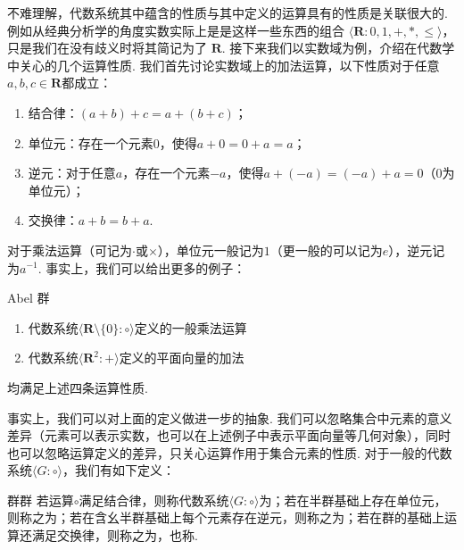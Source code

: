 不难理解，代数系统其中蕴含的性质与其中定义的运算具有的性质是关联很大的. 例如从经典分析学的角度实数实际上是是这样一些东西的组合 $\langle\mathbf{R}\colon 0, 1, +, *, \leqslant\rangle$，只是我们在没有歧义时将其简记为了 $\mathbf{R}$. 接下来我们以实数域为例，介绍在代数学中关心的几个运算性质. 我们首先讨论实数域上的加法运算，以下性质对于任意$a,b,c\in\mathbf{R}$都成立：

\begin{enumerate}
    \item 结合律：$(a+b)+c=a+(b+c)$；

    \item 单位元：存在一个元素$0$，使得$a+0=0+a=a$；

    \item 逆元：对于任意$a$，存在一个元素$-a$，使得$a+(-a)=(-a)+a=0$（0为单位元）；

    \item 交换律：$a+b=b+a$.
\end{enumerate}

对于乘法运算（可记为$\cdot$或$\times$），单位元一般记为$1$（更一般的可以记为$e$），逆元记为$a^{-1}$. 事实上，我们可以给出更多的例子：
\begin{example}{}{Abel 群}
    \begin{enumerate}
        \item 代数系统$\langle \mathbf{R}\setminus\{0\}\colon\circ\rangle$定义的一般乘法运算

        \item 代数系统$\langle \mathbf{R}^2\colon+\rangle$定义的平面向量的加法
    \end{enumerate}
    均满足上述四条运算性质.
\end{example}

事实上，我们可以对上面的定义做进一步的抽象. 我们可以忽略集合中元素的意义差异（元素可以表示实数，也可以在上述例子中表示平面向量等几何对象），同时也可以忽略运算定义的差异，只关心运算作用于集合元素的性质. 对于一般的代数系统$\langle G\colon\circ\rangle$，我们有如下定义：
\begin{definition}{群}{群}
    若运算$\circ$满足结合律，则称代数系统$\langle G\colon\circ\rangle$为；若在半群基础上存在单位元，则称之为；若在含幺半群基础上每个元素存在逆元，则称之为；若在群的基础上运算还满足交换律，则称之为，也称.
\end{definition}


